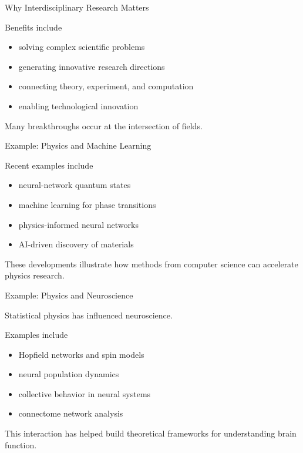 \documentclass{beamer}
\begin{document}
\begin{frame}{Why Interdisciplinary Research Matters}

Benefits include

\begin{itemize}
\item solving complex scientific problems
\item generating innovative research directions
\item connecting theory, experiment, and computation
\item enabling technological innovation
\end{itemize}

Many breakthroughs occur at the intersection of fields.

\end{frame}


\begin{frame}{Example: Physics and Machine Learning}

Recent examples include

\begin{itemize}
\item neural-network quantum states
\item machine learning for phase transitions
\item physics-informed neural networks
\item AI-driven discovery of materials
\end{itemize}

These developments illustrate how methods from
computer science can accelerate physics research.

\end{frame}


\begin{frame}{Example: Physics and Neuroscience}

Statistical physics has influenced neuroscience.

Examples include

\begin{itemize}
\item Hopfield networks and spin models
\item neural population dynamics
\item collective behavior in neural systems
\item connectome network analysis
\end{itemize}

This interaction has helped build theoretical
frameworks for understanding brain function.

\end{frame}
\end{document}
